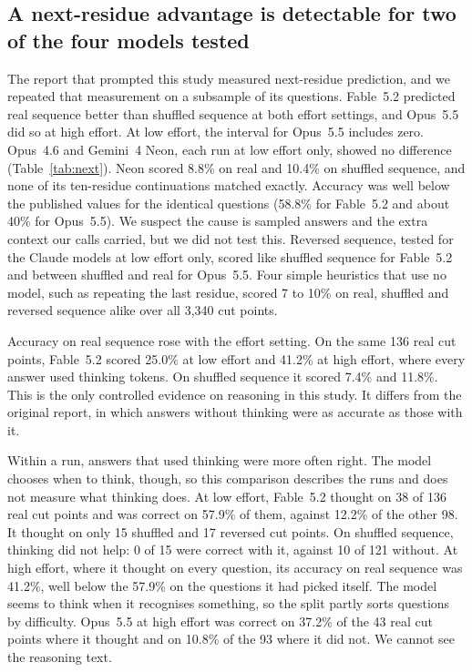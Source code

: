 \documentclass[11pt]{article}
\begin{document}
\subsection{A next-residue advantage is detectable for two of the four models tested}\label{sec:nextres}

The report that prompted this study measured next-residue prediction, and we repeated that measurement on
a subsample of its questions. Fable~5.2 predicted real sequence better than shuffled sequence at both effort settings, and Opus~5.5 did
so at high effort. At low effort, the interval for Opus~5.5 includes zero. Opus~4.6 and Gemini~4 Neon,
each run at low effort only, showed no difference (Table~\ref{tab:next}). Neon scored 8.8\% on real and
10.4\% on shuffled sequence, and none of its ten-residue continuations matched exactly. Accuracy was well
below the published values for the identical questions (58.8\% for Fable~5.2 and about 40\% for
Opus~5.5). We suspect the cause is sampled answers and the extra context our calls carried, but we did
not test this. Reversed sequence, tested for the Claude models at low effort only, scored like shuffled
sequence for Fable~5.2 and between shuffled and real for Opus~5.5. Four simple heuristics that use no
model, such as repeating the last residue, scored 7 to 10\% on real, shuffled and reversed sequence alike
over all 3,340 cut points.

Accuracy on real sequence rose with the effort setting. On the same 136 real cut points, Fable~5.2 scored
25.0\% at low effort and 41.2\% at high effort, where every answer used thinking tokens. On shuffled
sequence it scored 7.4\% and 11.8\%. This is the only controlled evidence on reasoning in this study. It
differs from the original report, in which answers without thinking were as accurate as those with it.

Within a run, answers that used thinking were more often right. The model chooses when to think, though,
so this comparison describes the runs and does not measure what thinking does. At low effort, Fable~5.2
thought on 38 of 136 real cut points and was correct on 57.9\% of them, against 12.2\% of the other 98.
It thought on only 15 shuffled and 17 reversed cut points. On shuffled sequence, thinking did not help:
0 of 15 were correct with it, against 10 of 121 without. At high effort, where it thought on every
question, its accuracy on real sequence was 41.2\%, well below the 57.9\% on the questions it had picked
itself. The model seems to think when it recognises something, so the split partly sorts questions by
difficulty. Opus~5.5 at high effort was correct on 37.2\% of the 43 real cut points where it thought and
on 10.8\% of the 93 where it did not. We cannot see the reasoning text.
\end{document}
